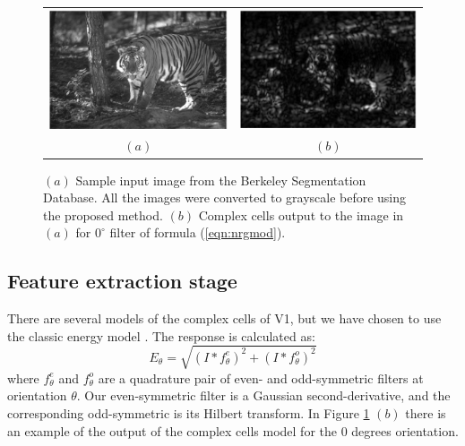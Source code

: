 \documentclass{llncs}
\begin{document}
\begin{figure}[]
	\begin{center}
		\begin{tabular}{cc}
			\includegraphics[width=0.4\linewidth]{./figs/af/esempio} &
			\includegraphics[width=0.4\linewidth]{./figs/af/esempio_fil} \\
			$(a)$ & $(b)$
		\end{tabular}
    \caption{$(a)$ Sample input image from the Berkeley Segmentation Database.
     All the images were converted to grayscale before using the proposed method.
     $(b)$ Complex cells output to the image in $(a)$ for $0^\circ$ filter of formula (\ref{eqn:nrgmod}).}
    \label{fig:exampleimg}
	\end{center}
\end{figure}


\subsection{Feature extraction stage}
\label{sec:ass_feature}
There are several models of the complex cells of V1, but we have chosen to
use the classic energy model \cite{Morrone88}.
The response is calculated as:
\begin{equation} \label{eqn:nrgmod}
E_\theta=\sqrt{\left(I*f^{e}_\theta \right)^2+\left(I*f^{o}_\theta \right)^2}
\end{equation}
where $f^{e}_\theta$ and $f^{o}_\theta$ are a quadrature pair of even- and
odd-symmetric filters at orientation $\theta$. Our even-symmetric filter is
a Gaussian second-derivative, and the corresponding odd-symmetric is its
Hilbert transform.
In Figure \ref{fig:exampleimg} $(b)$ there is an example of the output of the
complex cells model for the $0$ degrees orientation.
\end{document}
